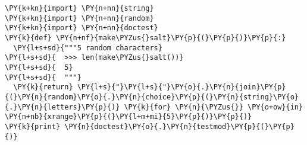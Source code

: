 \begin{Verbatim}[commandchars=\\\{\}]
\PY{k+kn}{import} \PY{n+nn}{string}
\PY{k+kn}{import} \PY{n+nn}{random}
\PY{k+kn}{import} \PY{n+nn}{doctest}
\PY{k}{def} \PY{n+nf}{make\PYZus{}salt}\PY{p}{(}\PY{p}{)}\PY{p}{:}
  \PY{l+s+sd}{"""5 random characters}
\PY{l+s+sd}{  >>> len(make\PYZus{}salt())}
\PY{l+s+sd}{  5}
\PY{l+s+sd}{  """}
  \PY{k}{return} \PY{l+s}{"}\PY{l+s}{"}\PY{o}{.}\PY{n}{join}\PY{p}{(}\PY{n}{random}\PY{o}{.}\PY{n}{choice}\PY{p}{(}\PY{n}{string}\PY{o}{.}\PY{n}{letters}\PY{p}{)} \PY{k}{for} \PY{n}{\PYZus{}} \PY{o+ow}{in} \PY{n+nb}{xrange}\PY{p}{(}\PY{l+m+mi}{5}\PY{p}{)}\PY{p}{)}
\PY{k}{print} \PY{n}{doctest}\PY{o}{.}\PY{n}{testmod}\PY{p}{(}\PY{p}{)}
\end{Verbatim}
